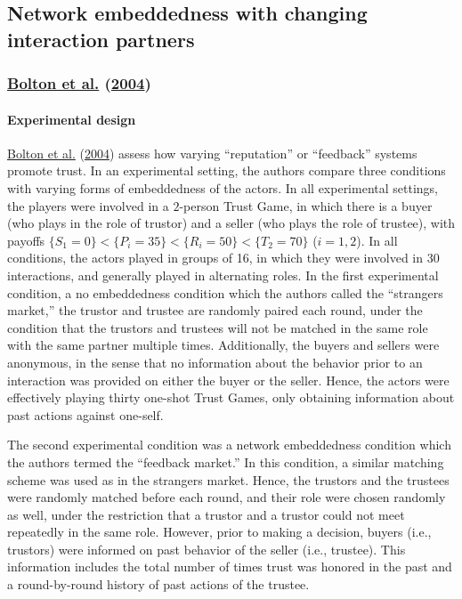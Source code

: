 \documentclass[
  11pt,
]{article}
\begin{document}
\hypertarget{network-embeddedness-with-changing-interaction-partners}{%
\subsection{Network embeddedness with changing interaction partners}\label{network-embeddedness-with-changing-interaction-partners}}

\hypertarget{bolton_electronic_2004}{%
\subsubsection{\texorpdfstring{\protect\hyperlink{ref-bolton_electronic_2004}{Bolton et al.} (\protect\hyperlink{ref-bolton_electronic_2004}{2004})}{Bolton et al. (2004)}}\label{bolton_electronic_2004}}

\hypertarget{experimental-design}{%
\paragraph{Experimental design}\label{experimental-design}}

\protect\hyperlink{ref-bolton_electronic_2004}{Bolton et al.} (\protect\hyperlink{ref-bolton_electronic_2004}{2004}) assess how varying ``reputation'' or ``feedback'' systems promote trust. In an experimental setting, the authors compare three conditions with varying forms of embeddedness of the actors. In all experimental settings, the players were involved in a \(2\)-person Trust Game, in which there is a buyer (who plays in the role of trustor) and a seller (who plays the role of trustee), with payoffs \(\{S_1 = 0\} < \{P_i = 35\} < \{R_i = 50\} < \{T_2 = 70\}\) (\(i = 1,2\)). In all conditions, the actors played in groups of 16, in which they were involved in 30 interactions, and generally played in alternating roles. In the first experimental condition, a no embeddedness condition which the authors called the ``strangers market,'' the trustor and trustee are randomly paired each round, under the condition that the trustors and trustees will not be matched in the same role with the same partner multiple times. Additionally, the buyers and sellers were anonymous, in the sense that no information about the behavior prior to an interaction was provided on either the buyer or the seller. Hence, the actors were effectively playing thirty one-shot Trust Games, only obtaining information about past actions against one-self.

The second experimental condition was a network embeddedness condition which the authors termed the ``feedback market.''
In this condition, a similar matching scheme was used as in the strangers market.
Hence, the trustors and the trustees were randomly matched before each round, and their role were chosen randomly as well, under the restriction that a trustor and a trustor could not meet repeatedly in the same role.
However, prior to making a decision, buyers (i.e., trustors) were informed on past behavior of the seller (i.e., trustee).
This information includes the total number of times trust was honored in the past and a round-by-round history of past actions of the trustee.
\end{document}
